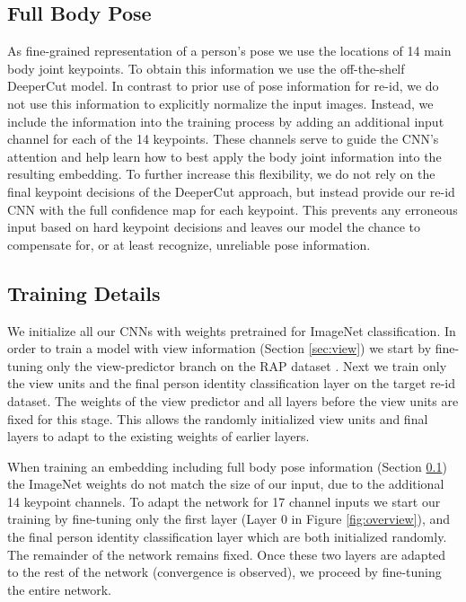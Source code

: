 \documentclass[10pt,twocolumn,letterpaper]{article}
\begin{document}
\subsection{Full Body Pose}
\label{sec:pose}

As fine-grained representation of a person's pose we use the locations of 14 main body
joint keypoints. To obtain this information we use the off-the-shelf DeeperCut \cite{deepercut}
model. In contrast to prior use of pose information for re-id, we do not use 
this information to explicitly normalize the input images. Instead, we include the information into the 
training process by adding an additional input channel for each of the 14 keypoints. These channels serve to guide the CNN's attention and help learn how to best apply the body joint information into the resulting embedding. To further increase this flexibility, we do not rely on the final keypoint decisions
of the DeeperCut approach, but instead provide our re-id CNN with the full confidence map for
each keypoint. This prevents any erroneous input based on hard keypoint decisions and leaves our model
the chance to compensate for, or at least recognize, unreliable pose information.

\subsection{Training Details}
We initialize all our CNNs with weights pretrained for ImageNet classification.
In order to train a model with view information (Section \ref{sec:view}) we start by fine-tuning only the view-predictor branch on the RAP dataset \cite{RAP}. Next we 
train only the view units and the final person identity classification layer on the target 
re-id dataset. The 
weights of the view predictor and all layers before the view units are fixed for this stage. This 
allows the randomly initialized view units and final layers to adapt to the existing weights of
earlier layers.

When training an embedding including full body pose information (Section \ref{sec:pose}) the ImageNet weights do not match the size of our input, due to the additional 14 keypoint channels. To adapt the network for 17 channel inputs we
start our training by fine-tuning only the first layer (Layer 0 in Figure \ref{fig:overview}), and the final person identity classification
layer which are both initialized randomly. The remainder of the network remains fixed. Once these
two layers are adapted to the rest of the network (\ie convergence is observed), we proceed by fine-tuning the entire network.
\end{document}
